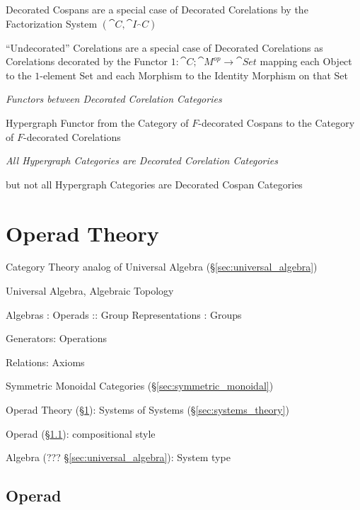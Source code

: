 Decorated Cospans are a special case of Decorated Corelations by the
Factorization System $(\cat{C},\cat{I}_\cat{C})$ %

``Undecorated'' Corelations are a special case of Decorated
Corelations as Corelations decorated by the Functor $1 :
\cat{C};\cat{M}^{op} \rightarrow \cat{Set}$ mapping each Object to the
$1$-element Set and each Morphism to the Identity Morphism on that Set


\emph{Functors between Decorated Corelation Categories} %

Hypergraph Functor from the Category of $F$-decorated Cospans to the
Category of $F$-decorated Corelations


\emph{All Hypergraph Categories are Decorated Corelation Categories}

but not all Hypergraph Categories are Decorated Cospan Categories



\section{Operad Theory}\label{sec:operad_theory}

Category Theory analog of Universal Algebra
(\S\ref{sec:universal_algebra})

Universal Algebra, Algebraic Topology

Algebras : Operads :: Group Representations : Groups

Generators: Operations

Relations: Axioms

Symmetric Monoidal Categories
(\S\ref{sec:symmetric_monoidal})

Operad Theory (\S\ref{sec:operad_theory}): Systems of Systems
(\S\ref{sec:systems_theory})

Operad (\S\ref{sec:operad}): compositional style

Algebra (??? \S\ref{sec:universal_algebra}): System type



\subsection{Operad}\label{sec:operad}

